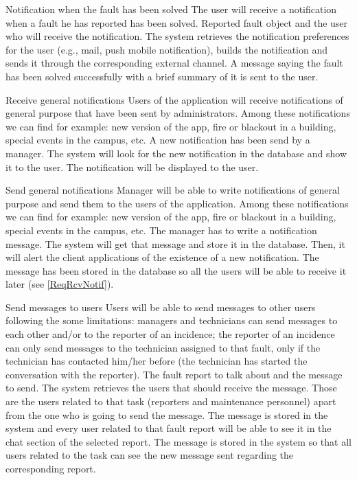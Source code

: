 \begin{requirement}{Notification when the fault has been solved}
\reqdesc The user will receive a notification when a fault he has reported has been solved.
\reqin Reported fault object and the user who will receive the notification.
\reqsteps The system retrieves the notification preferences for the user (e.g., mail, push mobile notification), builds the notification and sends it through the corresponding external channel.
\reqout A message saying the fault has been solved successfully with a brief summary of it is sent to the user.
\end{requirement}

\begin{requirement}{Receive general notifications}\label{ReqRcvNotif}
\reqdesc Users of the application will receive notifications of general purpose that have been sent by administrators. Among these notifications we can find for example: new version of the app, fire or blackout in a building, special events in the campus, etc.
\reqin A new notification has been send by a manager.
\reqsteps The system will look for the new notification in the database and show it to the user.
\reqout The notification will be displayed to the user.
\end{requirement}

\begin{requirement}{Send general notifications}
\reqdesc Manager will be able to write notifications of general purpose and send them to the users of the application. Among these notifications we can find for example: new version of the app, fire or blackout in a building, special events in the campus, etc.
\reqin The manager has to write a notification message.
\reqsteps The system will get that message and store it in the database. Then, it will alert the client applications of the existence of a new notification.
\reqout The message has been stored in the database so all the users will be able to receive it later (see \ref{ReqRcvNotif}).
\end{requirement}

\begin{requirement}{Send messages to users}
\reqdesc Users will be able to send messages to other users following the some limitations: managers and technicians can send messages to each other and/or to the reporter of an incidence; the reporter of an incidence can only send messages to the technician assigned to that fault, only if the technician has contacted him/her before (the technician has started the conversation with the reporter).
\reqin The fault report to talk about and the message to send.
\reqsteps The system retrieves the users that should receive the message. Those are the users related to that task (reporters and maintenance personnel) apart from the one who is going to send the message. The message is stored in the system and every user related to that fault report will be able to see it in the chat section of the selected report.
\reqout The message is stored in the system so that all users related to the task can see the new message sent regarding the corresponding report.
\end{requirement}

